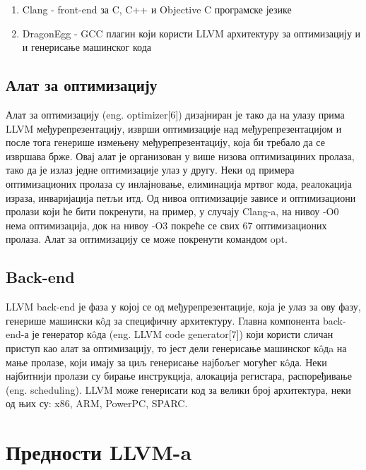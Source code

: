 \documentclass[12pt,oneside]{memoir}
\begin{document}
 \begin{enumerate}
 \item Clang - front-end за  C, C++ и Objective C програмске језике
 \item DragonEgg - GCC плагин који користи LLVM архитектуру за оптимизацију и 
 				 и генерисање машинског кода
 \end{enumerate}

 \subsection{Алат за оптимизацију}
 Алат за оптимизацију (eng. optimizer[6]) дизајниран је тако да на улазу прима LLVM
 међурепрезентацију, изврши оптимизације над међурепрезентацијом и после тога генерише
 измењену међурепрезентацију, која би требало да се извршава брже.
 Овај алат је организован у више низова оптимизациних пролаза, тако да је излаз
 једне оптимизације улаз у другу.
 Неки од примера оптимизационих пролаза су инлајновање, елиминација мртвог кода,
 реалокација израза, инваријација петљи итд. 
 Од нивоа оптимизације зависе и оптимизациони пролази који ће бити покренути,
 на пример, у случају Clang-a, на нивоу -O0 нема оптимизација, док на нивоу
 -O3 покреће се свих 67 оптимизационих пролаза.
 Алат за оптимизацију се може покренути командом opt.

\subsection{Back-end} 
LLVM back-end је фаза у којој се од међурепрезентације, која је улаз за ову фазу,
генерише машински к\^{o}д за специфичну архитектуру.
Главна компонента back-end-а је генератор к\^{o}да (eng. LLVM code generator[7]) који
користи сличан приступ као алат за оптимизацију, то јест дели генерисање машинског
к\^{o}дa на мање пролазе, који имају за циљ генерисање најбољег могућег к\^{o}да.
Неки најбитнији пролази су бирање инструкција, алокација регистара, распоређивање
(eng. scheduling).
LLVM може генерисати код за велики број архитектура, неки од њих су: x86, ARM,
PowerPC, SPARC.

\section{Предности LLVM-a}
\end{document}
